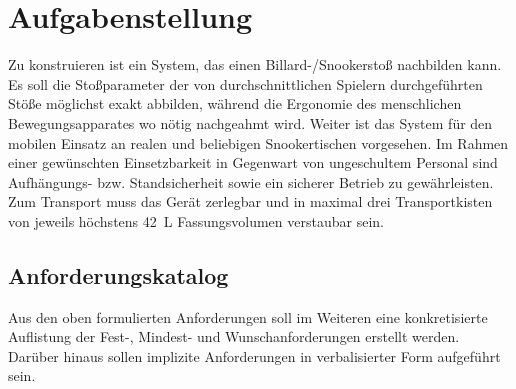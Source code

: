 \chapter{Aufgabenstellung}\label{chap:Aufgabenstellung}

	Zu konstruieren ist ein System, das einen Billard-/Snookerstoß nachbilden kann.
	Es soll die Stoßparameter der von durchschnittlichen Spielern durchgeführten Stöße möglichst exakt abbilden, während die Ergonomie des menschlichen Bewegungsapparates wo nötig nachgeahmt wird.
	Weiter ist das System für den mobilen Einsatz an realen und beliebigen Snookertischen vorgesehen. Im Rahmen einer gewünschten Einsetzbarkeit in Gegenwart von ungeschultem Personal sind Aufhängungs- bzw. Standsicherheit sowie ein sicherer Betrieb zu gewährleisten.
	Zum Transport muss das Gerät zerlegbar und in maximal drei Transportkisten von jeweils höchstens \SI{42}{L} Fassungsvolumen verstaubar sein.

	\section{Anforderungskatalog}
		Aus den oben formulierten Anforderungen soll im Weiteren eine konkretisierte Auflistung der Fest-, Mindest- und Wunschanforderungen erstellt werden.
		Darüber hinaus sollen implizite Anforderungen in verbalisierter Form aufgeführt sein.\par\medskip

